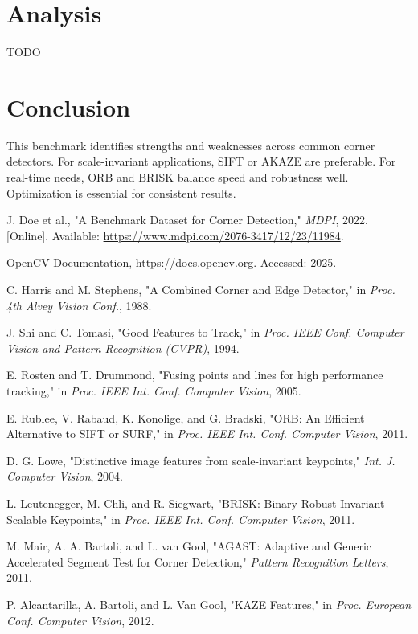 \documentclass[journal]{IEEEtran}
\begin{document}
\section{Analysis}
TODO

\section{Conclusion}
This benchmark identifies strengths and weaknesses across common corner detectors. For scale-invariant applications, SIFT or AKAZE are preferable. For real-time needs, ORB and BRISK balance speed and robustness well. Optimization is essential for consistent results.





\begin{thebibliography}{1}

    J. Doe et al., "A Benchmark Dataset for Corner Detection," \textit{MDPI}, 2022. [Online]. Available: \url{https://www.mdpi.com/2076-3417/12/23/11984}.

    OpenCV Documentation, \url{https://docs.opencv.org}. Accessed: 2025.

    C. Harris and M. Stephens, "A Combined Corner and Edge Detector," in \textit{Proc. 4th Alvey Vision Conf.}, 1988.

    J. Shi and C. Tomasi, "Good Features to Track," in \textit{Proc. IEEE Conf. Computer Vision and Pattern Recognition (CVPR)}, 1994.

    E. Rosten and T. Drummond, "Fusing points and lines for high performance tracking," in \textit{Proc. IEEE Int. Conf. Computer Vision}, 2005.

    E. Rublee, V. Rabaud, K. Konolige, and G. Bradski, "ORB: An Efficient Alternative to SIFT or SURF," in \textit{Proc. IEEE Int. Conf. Computer Vision}, 2011.

    D. G. Lowe, "Distinctive image features from scale-invariant keypoints," \textit{Int. J. Computer Vision}, 2004.

    L. Leutenegger, M. Chli, and R. Siegwart, "BRISK: Binary Robust Invariant Scalable Keypoints," in \textit{Proc. IEEE Int. Conf. Computer Vision}, 2011.

    M. Mair, A. A. Bartoli, and L. van Gool, "AGAST: Adaptive and Generic Accelerated Segment Test for Corner Detection," \textit{Pattern Recognition Letters}, 2011.

    P. Alcantarilla, A. Bartoli, and L. Van Gool, "KAZE Features," in \textit{Proc. European Conf. Computer Vision}, 2012.

\end{thebibliography}

\onecolumn
\appendix
\end{document}
